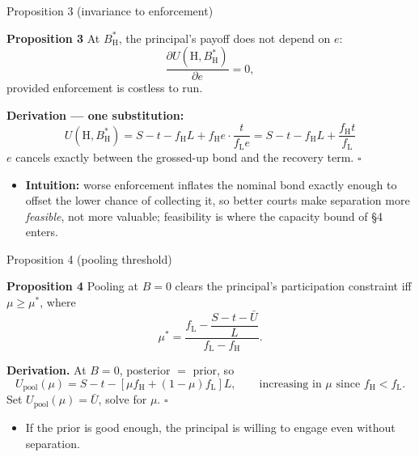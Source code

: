 \documentclass[11pt,aspectratio=169]{beamer}
\newcommand{\Ht}{\mathrm{H}}
\newcommand{\fH}{f_{\mathrm{H}}}
\newcommand{\fL}{f_{\mathrm{L}}}
\newcommand{\BH}{B^{*}_{\mathrm{H}}}
\newcommand{\Ubar}{\bar U}
\newcommand{\PropTitle}[1]{\textbf{Proposition #1}}
\begin{document}
\begin{frame}{Proposition 3 (invariance to enforcement)}
\small
\begin{exampleblock}{\PropTitle{3}}
At $\BH$, the principal's payoff does not depend on $e$:
\begin{equation*}
  \frac{\partial U(\Ht,\BH)}{\partial e}=0,
\end{equation*}
provided enforcement is costless to run.
\end{exampleblock}
\vfill
\textbf{Derivation --- one substitution:}
\begin{equation*}
  U(\Ht,\BH) = S-t-\fH L + \fH e\cdot\frac{t}{\fL e} = S-t-\fH L+\frac{\fH t}{\fL}
\end{equation*}
$e$ \alert{cancels exactly} between the grossed-up bond and the recovery term. $\square$
\vfill
\begin{itemize}
  \item \textbf{Intuition:} worse enforcement inflates the nominal bond exactly enough to offset the lower chance of collecting it, so better courts make separation more \emph{feasible}, not more valuable; feasibility is where the capacity bound of \S4 enters.
\end{itemize}
\end{frame}

\begin{frame}{Proposition 4 (pooling threshold)}
\begin{exampleblock}{\PropTitle{4}}
Pooling at $B=0$ clears the principal's participation constraint iff $\mu\ge\mu^{*}$, where
\begin{equation*}
  \mu^{*} = \frac{\fL-\dfrac{S-t-\Ubar}{L}}{\fL-\fH}.
\end{equation*}
\end{exampleblock}
\vfill
\textbf{Derivation.} At $B=0$, posterior $=$ prior, so
\begin{equation*}
  U_{\mathrm{pool}}(\mu) = S-t-[\mu\fH+(1-\mu)\fL]L, \qquad \text{increasing in } \mu \text{ since } \fH<\fL.
\end{equation*}
Set $U_{\mathrm{pool}}(\mu)=\Ubar$, solve for $\mu$. $\square$
\vfill
\begin{itemize}
  \item If the prior is good enough, the principal is willing to engage even without separation.
\end{itemize}
\end{frame}
\end{document}
